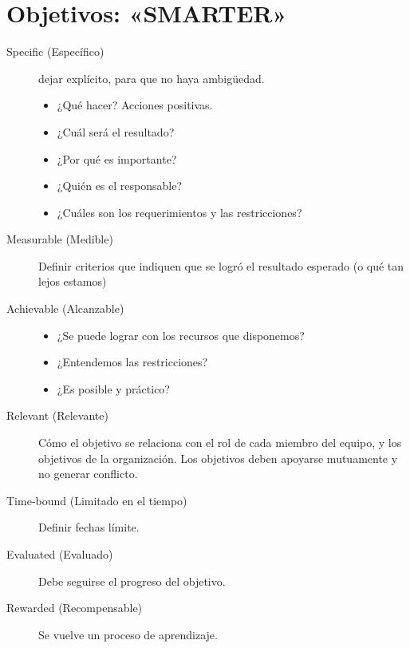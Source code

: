 \section*{Objetivos: «SMARTER»}
\begin{description}
	\item[Specific (Específico)] dejar explícito, para que no haya ambigüedad.
		\begin{itemize}
			\item ¿Qué hacer? Acciones positivas.
			\item ¿Cuál será el resultado?
			\item ¿Por qué es importante?
			\item ¿Quién es el responsable?
			\item ¿Cuáles son los requerimientos y las restricciones?
		\end{itemize}
	\item[Measurable (Medible)]
	Definir criterios que indiquen que se logró el resultado esperado (o qué tan lejos estamos)
\item[Achievable (Alcanzable)]
	\begin{itemize}
		\item ¿Se puede lograr con los recursos que disponemos?
		\item ¿Entendemos las restricciones?
		\item ¿Es posible y práctico?
	\end{itemize}
\item[Relevant (Relevante)]
	Cómo el objetivo se relaciona con el rol de cada miembro del equipo, y los objetivos de la organización.
	Los objetivos deben apoyarse mutuamente y no generar conflicto.
\item[Time-bound (Limitado en el tiempo)]
	Definir fechas límite.
\item[Evaluated (Evaluado)]
	Debe seguirse el progreso del objetivo.
\item[Rewarded (Recompensable)]
	Se vuelve un proceso de aprendizaje.
\end{description}
